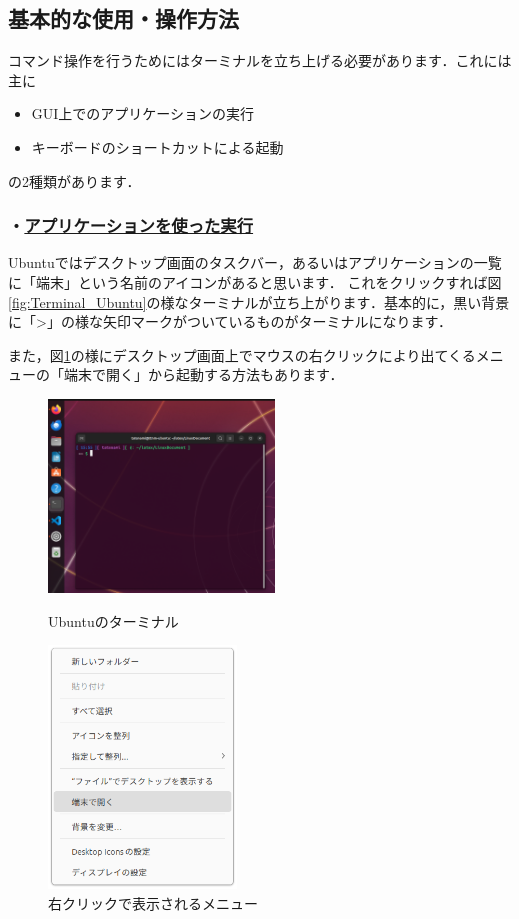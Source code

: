 \documentclass[autodetect-engine,dvi=dvipdfmx,ja=standard,a4j]{bxjsarticle}
\begin{document}
\subsection{基本的な使用・操作方法}
コマンド操作を行うためにはターミナルを立ち上げる必要があります．これには主に
\begin{itemize}
    \item GUI上でのアプリケーションの実行
    \item キーボードのショートカットによる起動
\end{itemize}
の2種類があります．

\subsubsection*{・\underline{アプリケーションを使った実行}}
Ubuntuではデスクトップ画面のタスクバー，あるいはアプリケーションの一覧に「端末」という名前のアイコンがあると思います．
これをクリックすれば図\ref{fig:Terminal_Ubuntu}の様なターミナルが立ち上がります．基本的に，黒い背景に「\textgreater」の様な矢印マークがついているものがターミナルになります．

また，図\ref{fig:Ubuntu_Menu}の様にデスクトップ画面上でマウスの右クリックにより出てくるメニューの「端末で開く」から起動する方法もあります．

\begin{figure}[H]
    \centering
\begin{minipage}[h]{0.45\linewidth}
    \centering
    \includegraphics[width=60mm]{image/Terminal_ubuntu.png}
    \caption{Ubuntuのターミナル}
    \label{fig:Terminal_Ubuntu}
\end{minipage}
\hspace{10mm}
\begin{minipage}[h]{0.45\linewidth}
    \centering
    \includegraphics[width=50mm]{image/Ubuntu_Menu.png}
    \caption{右クリックで表示されるメニュー}
    \label{fig:Ubuntu_Menu}
\end{minipage}
\end{figure}
\end{document}
